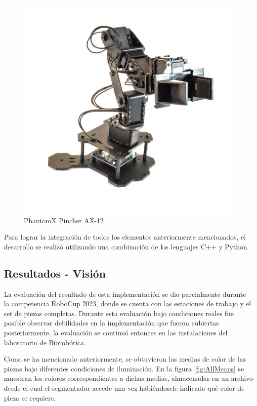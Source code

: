             \begin{figure}[H]
                \centering
                \includegraphics[scale=0.2]{Figures/Phantom_Pincher.jpg}
                    \caption{PhantomX Pincher AX-12 \cite{Inerbotix_pincher_arm}}
                    \label{fig:Phantom_Pincher}
            \end{figure}
Para lograr la integración de todos los elementos anteriormente mencionados, el desarrollo se realizó utilizando una combinación de los lenguajes C++ y Python. 

\subsection{Resultados - Visión}
La evaluación del resultado de esta implementación se dio parcialmente durante la competencia RoboCup 2023, donde se cuenta con las estaciones de trabajo y el set de piezas completas. Durante esta evaluación bajo condiciones reales fue posible observar debilidades en la implementación que fueron cubiertas posteriormente, la evaluación se continuó entonces en las instalaciones del laboratorio de Biorobótica. 

Como se ha mencionado anteriormente, se obtuvieron las medias de color de las piezas bajo diferentes condiciones de iluminación. En la figura \ref{fig:AllMeans} se muestran los colores correspondientes a dichas medias, almacenadas en un archivo desde el cual el segmentador accede una vez habiéndosele indicado qué color de pieza se requiere. 

